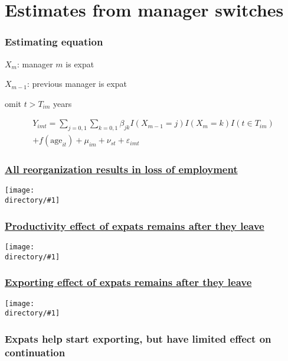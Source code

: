 \documentclass[aspectratio=169,compress,mathserif]{beamer}
\newcommand{\regressiontable}[1]{}
\newcommand{\directory}{output/figure}
\newcommand{\longfigure}[2]{\begin{frame}\frametitle{\hyperlink{#1back}{#2}}\hypertarget{#1}{{\begin{center}\texttt{[image: \\directory/\#1]}\end{center}}}\end{frame}}
\begin{document}
\section{Estimates from manager switches}\hypertarget{Estimates from manager switches}{}


\begin{frame}\frametitle{Estimating equation}\hypertarget{Estimating equation}{}
$X_{m}$: manager $m$ is expat 


$X_{m-1}$: previous manager is expat 


omit $t>T_{im}$ years


\begin{multline*}
Y_{imt} = 
\sum_{j=0,1}\sum_{k=0,1} \beta_{jk} I(X_{m-1}=j)I(X_{m}=k)I(t\in T_{im})\\
+f(\text{age}_{it})
+\mu_{im} + \nu_{st} + \varepsilon_{imt}
\end{multline*}


\end{frame}




\longfigure{lnL_tree}{All reorganization results in loss of employment}
\longfigure{lnQL_tree}{Productivity effect of expats remains after they leave}
\longfigure{exporter_tree}{Exporting effect of expats remains after they leave}


\begin{frame}\frametitle{Expats help start exporting, but have limited effect on continuation}\hypertarget{Expats help start exporting, but have limited effect on continuation}{}
\regressiontable{exporter_heterogeneity}


\end{frame}
\end{document}
